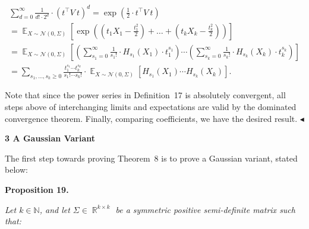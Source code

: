 \[\begin{gathered}
\displaystyle\sum_{d=0}^{\infty}\frac{1}{d!\cdot 2^{d}}\cdot\left(t^{\top}V\ t\right)^{d} \displaystyle=\exp\left(\frac{1}{2}\cdot t^{\top}V\ t\right) \\
\displaystyle=\mathop{\mathbb{E}}_{X\sim\mathcal{N}(0,\Sigma)}\left[\exp\left(\left(t_{1}X_{1}-\frac{t_{1}^{2}}{2}\right)+\dots+\left(t_{k}X_{k}-\frac{t_{k}^{2}}{2}\right)\right)\right] \\
\displaystyle=\mathop{\mathbb{E}}_{X\sim\mathcal{N}(0,\Sigma)}\left[\left(\sum_{s_{1}=0}^{\infty}\frac{1}{s_{1}!}\cdot H_{s_{1}}(X_{1})\cdot t_{1}^{s_{1}}\right)\cdots\left(\sum_{s_{k}=0}^{\infty}\frac{1}{s_{k}!}\cdot H_{s_{k}}(X_{k})\cdot t_{k}^{s_{k}}\right)\right] \\
\displaystyle=\sum_{s_{1},\dots,s_{k}\geqslant 0}\frac{t_{1}^{s_{1}}\cdots t_{k}^{s_{k}}}{s_{1}!\cdots s_{k}!}\cdot\mathop{\mathbb{E}}_{X\sim\mathcal{N}(0,\Sigma)}\left[H_{s_{1}}(X_{1})\cdots H_{s_{k}}(X_{k})\right].
\end{gathered}\]


Note that since the power series in Definition 17 is absolutely convergent, all steps above of interchanging limits and expectations are valid by the dominated convergence theorem.
Finally, comparing coefficients, we have the desired result.
$\blacktriangleleft$\par






\par\medskip\noindent\textbf{
3 A Gaussian Variant}\par




The first step towards proving Theorem 8 is to prove a Gaussian variant, stated below:\par





\par\medskip\noindent\textbf{
\textbf{Proposition 19}\textbf{.}
}\par



\emph{Let $k\in\mathbb{N}$, and let $\Sigma\in\mathop{\mathbb{R}}^{k\times k}$ be a symmetric positive semi-definite matrix such that:}\par


